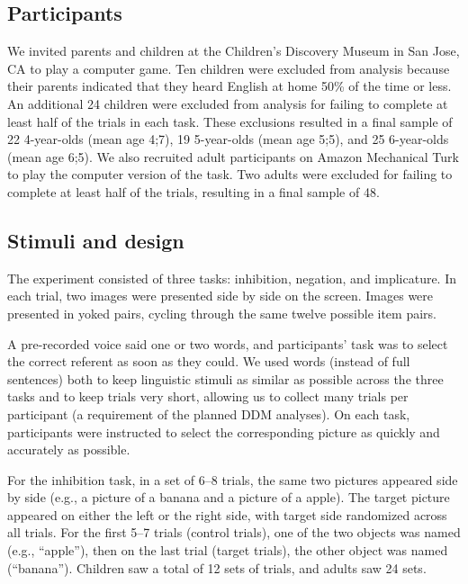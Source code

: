 \documentclass[man, noapacite]{apa2}
\begin{document}
\subsection{Participants}

We invited parents and children at the Children's Discovery Museum in San Jose, CA to play a computer game. Ten children were excluded from analysis because their parents indicated that they heard English at home 50\% of the time or less. An additional 24 children were excluded from analysis for failing to complete at least half of the trials in each task. These exclusions resulted in a final sample of 22 4-year-olds (mean age 4;7), 19 5-year-olds (mean age 5;5), and 25 6-year-olds (mean age 6;5). We also recruited adult participants on Amazon Mechanical Turk to play the computer version of the task. Two adults were excluded for failing to complete at least half of the trials, resulting in a final sample of 48.

\subsection{Stimuli and design}

The experiment consisted of three tasks: inhibition, negation, and implicature. In each trial, two images were presented side by side on the screen. Images were presented in yoked pairs, cycling through the same twelve possible item pairs. 

A pre-recorded voice said one or two words, and participants' task was to select the correct referent as soon as they could. We used words (instead of full sentences) both to keep linguistic stimuli as similar as possible across the three tasks and to keep trials very short, allowing us to collect many trials per participant (a requirement of the planned DDM analyses). On each task, participants were instructed to select the corresponding picture as quickly and accurately as possible.  

For the inhibition task, in a set of 6--8 trials, the same two pictures appeared side by side (e.g., a picture of a banana and a picture of a apple). The target picture appeared on either the left or the right side, with target side randomized across all trials. For the first 5--7 trials (control trials), one of the two objects was named (e.g., ``apple''), then on the last trial (target trials), the other object was named (``banana'').
Children saw a total of 12 sets of trials, and adults saw 24 sets.
\end{document}
